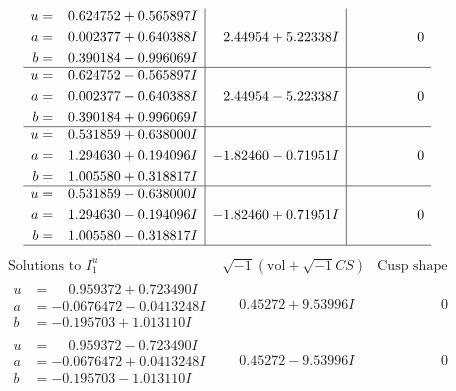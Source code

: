 \documentclass[1p]{elsarticle_modified}
\theoremstyle{definition}
\newcommand{\I}{\sqrt{-1}}
\begin{document}
$$\begin{array}{c|c|c}
\begin{aligned}
u &= \phantom{-}0.624752 + 0.565897 I \\
a &= \phantom{-}0.002377 + 0.640388 I \\
b &= \phantom{-}0.390184 - 0.996069 I\end{aligned}
 & \phantom{-}2.44954 + 5.22338 I & \phantom{-0.000000 } 0 \\ \hline\begin{aligned}
u &= \phantom{-}0.624752 - 0.565897 I \\
a &= \phantom{-}0.002377 - 0.640388 I \\
b &= \phantom{-}0.390184 + 0.996069 I\end{aligned}
 & \phantom{-}2.44954 - 5.22338 I & \phantom{-0.000000 } 0 \\ \hline\begin{aligned}
u &= \phantom{-}0.531859 + 0.638000 I \\
a &= \phantom{-}1.294630 + 0.194096 I \\
b &= \phantom{-}1.005580 + 0.318817 I\end{aligned}
 & -1.82460 - 0.71951 I & \phantom{-0.000000 } 0 \\ \hline\begin{aligned}
u &= \phantom{-}0.531859 - 0.638000 I \\
a &= \phantom{-}1.294630 - 0.194096 I \\
b &= \phantom{-}1.005580 - 0.318817 I\end{aligned}
 & -1.82460 + 0.71951 I & \phantom{-0.000000 } 0\\
 \hline 
 \end{array}$$\newpage$$\begin{array}{c|c|c}  
\text{Solutions to }I^u_{1}& \I (\text{vol} + \sqrt{-1}CS) & \text{Cusp shape}\\
 \hline 
\begin{aligned}
u &= \phantom{-}0.959372 + 0.723490 I \\
a &= -0.0676472 - 0.0413248 I \\
b &= -0.195703 + 1.013110 I\end{aligned}
 & \phantom{-}0.45272 + 9.53996 I & \phantom{-0.000000 } 0 \\ \hline\begin{aligned}
u &= \phantom{-}0.959372 - 0.723490 I \\
a &= -0.0676472 + 0.0413248 I \\
b &= -0.195703 - 1.013110 I\end{aligned}
 & \phantom{-}0.45272 - 9.53996 I & \phantom{-0.000000 } 0 \\ \hline\begin{aligned}

\end{aligned}
\end{array}$$
\end{document}
